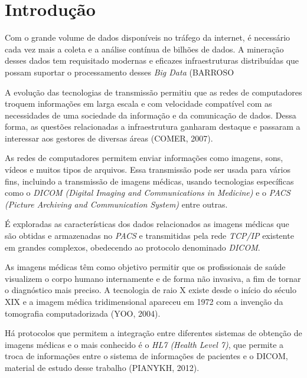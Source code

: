 \documentclass[
	12pt,				%
	openright,			%
	twoside,			%
	a4paper,			%
	english,			%
	french,				%
	spanish,			%
	brazil				%
	]{abntex2}
\begin{document}
\textual

\chapter*[Introdução]{Introdução}

Com o grande volume de dados disponíveis no tráfego da internet, é necessário cada vez mais a coleta e a análise contínua de bilhões de dados. A mineração desses dados tem requisitado modernas e eficazes infraestruturas distribuídas que possam suportar o processamento desses \emph{Big Data} (BARROSO%

A evolução das tecnologias de transmissão permitiu que as redes de computadores troquem informações em larga escala e com velocidade compatível com as necessidades de uma sociedade da informação e da comunicação de dados. Dessa forma, as questões relacionadas a infraestrutura ganharam destaque e passaram a interessar aos gestores de diversas áreas (COMER, 2007).

As redes de computadores permitem enviar informações como imagens, sons, vídeos e muitos tipos de arquivos. Essa transmissão pode ser usada para vários fins, incluindo a transmissão de imagens médicas, usando tecnologias específicas como o \emph{DICOM (Digital Imaging and Communications in Medicine)} e o \emph{PACS (Picture Archiving and Communication System)} entre outras.

É exploradas as características dos dados relacionados as imagens médicas que são obtidas e armazenadas no \emph{PACS} e transmitidas pela rede \emph{TCP/IP} existente em grandes complexos, obedecendo ao protocolo denominado \emph{DICOM}.

As imagens médicas têm como objetivo permitir que os profissionais de saúde visualizem o corpo humano internamente e de forma não invasiva, a fim de tornar o diagnóstico mais preciso. A tecnologia de raio X existe desde o início do século XIX e a imagem médica 
tridimensional apareceu em 1972 com a invenção da tomografia computadorizada (YOO, 2004).

Há protocolos que permitem a integração entre diferentes sistemas de obtenção de imagens médicas e o mais conhecido é o \emph{HL7 (Health Level 7)}, que permite a troca de informações entre o sistema de informações de pacientes e o DICOM, material de estudo desse trabalho (PIANYKH, 2012).
\end{document}
